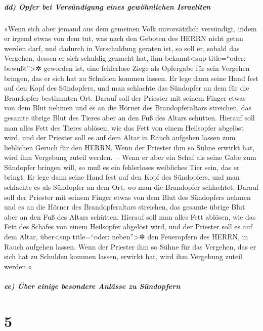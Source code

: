 \hypertarget{dd-opfer-bei-versuxfcndigung-eines-gewuxf6hnlichen-israeliten}{%
\subparagraph{dd) Opfer bei Versündigung eines gewöhnlichen
Israeliten}\label{dd-opfer-bei-versuxfcndigung-eines-gewuxf6hnlichen-israeliten}}

»Wenn sich aber jemand aus dem gemeinen Volk
unvorsätzlich versündigt, indem er irgend etwas von dem tut, was nach
den Geboten des HERRN nicht getan werden darf, und dadurch in
Verschuldung geraten ist, so soll er, sobald das
Vergehen, dessen er sich schuldig gemacht hat, ihm bekannt\textless sup
title=``oder: bewußt''\textgreater✲ geworden ist, eine fehlerlose Ziege
als Opfergabe für sein Vergehen bringen, das er sich hat zu Schulden
kommen lassen. Er lege dann seine Hand fest auf den Kopf
des Sündopfers, und man schlachte das Sündopfer an dem für die
Brandopfer bestimmten Ort. Darauf soll der Priester mit
seinem Finger etwas von dem Blut nehmen und es an die Hörner des
Brandopferaltars streichen, das gesamte übrige Blut des Tieres aber an
den Fuß des Altars schütten. Hierauf soll man alles Fett
des Tieres ablösen, wie das Fett von einem Heilsopfer abgelöst wird, und
der Priester soll es auf dem Altar in Rauch aufgehen lassen zum
lieblichen Geruch für den HERRN. Wenn der Priester ihm so Sühne erwirkt
hat, wird ihm Vergebung zuteil werden.~-- Wenn er aber
ein Schaf als seine Gabe zum Sündopfer bringen will, so muß es ein
fehlerloses weibliches Tier sein, das er bringt. Er lege
dann seine Hand fest auf den Kopf des Sündopfers, und man schlachte es
als Sündopfer an dem Ort, wo man die Brandopfer schlachtet.
Darauf soll der Priester mit seinem Finger etwas von dem
Blut des Sündopfers nehmen und es an die Hörner des Brandopferaltars
streichen, das gesamte übrige Blut aber an den Fuß des Altars schütten.
Hierauf soll man alles Fett ablösen, wie das Fett des
Schafes von einem Heilsopfer abgelöst wird, und der Priester soll es auf
dem Altar, über\textless sup title=``oder: neben''\textgreater✲ den
Feueropfern des HERRN, in Rauch aufgehen lassen. Wenn der Priester ihm
so Sühne für das Vergehen, das er sich hat zu Schulden kommen lassen,
erwirkt hat, wird ihm Vergebung zuteil werden.«

\hypertarget{ee-uxfcber-einige-besondere-anluxe4sse-zu-suxfcndopfern}{%
\subparagraph{ee) Über einige besondere Anlässe zu
Sündopfern}\label{ee-uxfcber-einige-besondere-anluxe4sse-zu-suxfcndopfern}}

\hypertarget{section-4}{%
\section{5}\label{section-4}}

